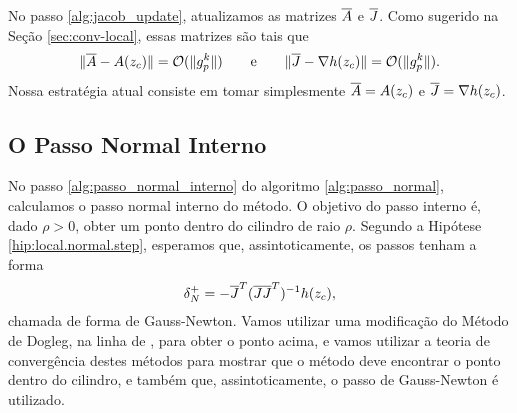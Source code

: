 No passo \ref{alg:jacob_update}, atualizamos as matrizes $\overline{A}$ e
$\overline{J}$. Como sugerido na Seção \ref{sec:conv-local}, essas matrizes são tais que
$$\Vert \overline{A} - A(z_c)\Vert = \mathcal{O}(\Vert g_p^{k}\Vert) \qquad \mbox{e} \qquad
\Vert \overline{J} - \nabla h(z_c)\Vert = \mathcal{O}(\Vert g_p^{k}\Vert).$$
Nossa estratégia atual consiste em tomar simplesmente $\overline{A} = A(z_c)$ e 
$\overline{J} = \nabla h(z_c)$.

\subsection{O Passo Normal Interno}

No passo \ref{alg:passo_normal_interno} do algoritmo \ref{alg:passo_normal},
calculamos o passo normal interno do método.
O objetivo do passo interno é, dado $\rho > 0$, obter um ponto dentro do
cilindro de raio $\rho$. 
Segundo a Hipótese \ref{hip:local.normal.step}, esperamos que,
assintoticamente, os passos tenham a forma
$$\delta_N^+ = -\overline{J}^T(\overline{J}\overline{J}^T)^{-1}h(z_c),$$
chamada de forma de Gauss-Newton.
Vamos utilizar uma modificação do Método de Dogleg, na linha de
\cite{bib:francisco,bib:porcelli}, para obter o ponto acima, e vamos utilizar a
teoria de convergência destes métodos para mostrar que o método deve encontrar o
ponto dentro do cilindro, e também que, assintoticamente, o passo de Gauss-Newton
é utilizado.

